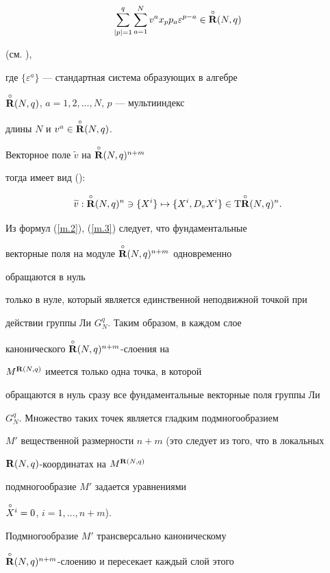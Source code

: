 \begin{pf}
\begin{equation}
\sum^q_{|p|=1}\sum^N_{a=1}v^ax_pp_a\varepsilon^{p-a}\in\puto{\R}(N,q)


\label{m.2}


\end{equation}


(см. \cite{VSh12}),


где $\{\varepsilon^a\}$ --- стандартная система образующих в алгебре


$\overset{\circ}{{\bold R}}{}(N,q)$, $a=1,2,\dotsc,N$, $p$ --- мультииндекс


длины $N$ и $v^a\in\overset{\circ}{{\bold R}}{}(N,q)$.


Векторное поле $\widetilde v$ на $\overset{\circ}{{\bold R}}{}(N,q)^{n+m}$


тогда имеет вид (\cite{VSh12}):


\begin{equation}


\widetilde v:\puto{\R}(N,q)^n\ni\{X^i\}\mapsto


\{X^i,D_vX^i\}\in {\mathrm T}\puto{\R}(N,q)^n.


\label{m.3}


\end{equation}


Из формул (\ref{m.2}), (\ref{m.3}) следует, что фундаментальные


векторные поля на модуле $\overset{\circ}{{\bold R}}{}(N,q)^{n+m}$ одновременно


обращаются в нуль


только в нуле, который является единственной неподвижной точкой при


действии группы Ли $G^q_N$. Таким образом, в каждом слое


канонического $\overset{\circ}{{\bold R}}{}(N,q)^{n+m}$-слоения на


$M^{{\bold R}(N,q)}$ имеется только одна точка, в которой


обращаются в нуль сразу все фундаментальные векторные поля группы Ли


$G^q_N$. Множество таких точек является гладким подмногообразием


$M'$ вещественной размерности $n+m$ (это следует из того, что в локальных


${\bold R}(N,q)$-координатах на $M^{{\bold R}(N,q)}$


подмногообразие $M'$ задается уравнениями


$\overset{\circ}{X}{}^i=0$, $i=1,\dotsc,n+m$).


Подмногообразие $M'$ трансверсально каноническому


$\overset{\circ}{{\bold R}}{}(N,q)^{n+m}$-слоению и пересекает каждый слой этого



\end{pf}
